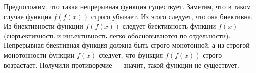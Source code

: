 \documentclass{article}
\begin{document}
Предположим, что такая непрерывная функция существует. Заметим, что в таком случае функция $f(f(x))$ строго убывает. Из этого следует, что она биективна. 
Из биективности функции $f(f(x))$ следует биективность функции $f(x)$ (сюръективность и инъективность легко обосновываются по отдельности). Непрерывная биективная 
функция должна быть строго монотонной, а из строгой монотонности функции $f(x)$ следует, что функция $f(f(x))$ строго возрастает. Получили противоречие --- значит, такой функции не существует.
\end{document}
